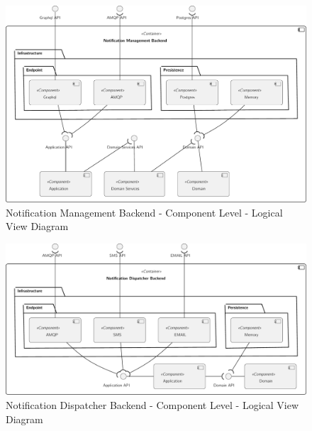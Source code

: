 \begin{figure}[H]
   \centering
   \includegraphics[page=1,width=\columnwidth]{assets/diagrams/design/architectural/level3/logical/notification-management-backend.pdf}
   \caption[Notification Management Backend - Component Level - Logical View Diagram]{Notification Management Backend - Component Level - Logical View Diagram}
   \label{fig:AppendixC2:noti}
\end{figure}

\begin{figure}[H]
   \centering
   \includegraphics[page=1,width=\columnwidth]{assets/diagrams/design/architectural/level3/logical/notification-dispatcher-backend.pdf}
   \caption[Notification Dispatcher Backend - Component Level - Logical View Diagram]{Notification Dispatcher Backend - Component Level - Logical View Diagram}
   \label{fig:AppendixC2:notidispatcher}
\end{figure}
